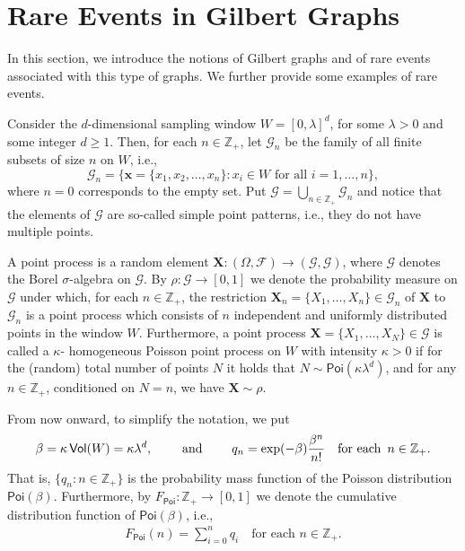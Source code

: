 \documentclass[pdflatex, sn-mathphys-ay]{sn-jnl}%
\newcommand{\intg}{\mathbb{Z}}
\newcommand{\mc}{\mathcal}
\renewcommand{\v}[1]{\boldsymbol{#1}}
\newcommand{\poi}{\textsf{Poi}}
\newcommand{\mx}{\v{x}}
\newcommand{\mX}{\v{X}}
\newcommand{\scG}{\mathscr{G}}
\newcommand{\vol}{\mathsf{Vol}}
\theoremstyle{thmstyleone}%
\theoremstyle{thmstyletwo}%
\theoremstyle{thmstylethree}%
\begin{document}
\section{Rare Events in Gilbert Graphs}
\label{sec:prelim}
In this section, we introduce the notions of   Gilbert graphs and of rare events associated with this type of graphs. We further provide some  examples of rare events. 

Consider the $d$-dimensional sampling window ${W = [0, \lambda]^d}$,  for some $\lambda>0$ and some integer  $d\ge 1$.  Then, for each ${n \in \intg_+}$, let $\scG_n$ be the family of all finite subsets of size $n$ on $W$, i.e.,
\[
\scG_n = \Big\{\mx = \{x_1, x_2, \dots, x_n\} : x_i \in W\,\, \text{for all}\,\, i=1,\ldots, n \Big\},
\]
where $n = 0$ corresponds to the empty set. Put ${\scG = \bigcup_{n \in \intg_+} \scG_n}$ and 
notice that the elements of $\scG$ are so-called  simple point patterns, i.e., they do not have multiple points.

A  point process is a random element ${\mX : (\Omega, \mc F) \to (\scG, \mc G)}$, where $\mc G$ denotes the Borel $\sigma$-algebra on $\scG$. 
By $\rho:\mc G\to[0,1]$ we denote the probability measure on $\scG$ under which, for each $n \in \intg_+$, 
the restriction $\mX_n = \{X_1, \dots, X_n\} \in \scG_n$ of $\mX$  to $\scG_n$  is a point process which consists of $n$ independent and uniformly distributed points in the window $W$.  
Furthermore, a point process $\mX = \{X_1, \dots, X_N\}\in \scG$ is called a $\kappa$- homogeneous Poisson point process  on $W$ 
with intensity ${\kappa > 0}$ if for the  (random) total number of points $N$ it holds that ${N \sim \mathsf{Poi}(\kappa \lambda^d)}$, and for any $n \in \intg_+$, conditioned on $N = n$, we have $\mX \sim \rho$.

From now onward, to simplify the notation, we put
\begin{align}
\beta = \kappa\, \vol(W) = \kappa \lambda^d,
\qquad\text{ and }\qquad
q_n = \exp(-\beta) \frac{\beta^n}{n!} \quad\mbox{for each \,$n \in \intg_+$}. 
\label{eqn:defn-beta}
\end{align}
That is, $\{q_n : n \in \intg_+\}$ is the probability mass function of the Poisson distribution $\poi(\beta)$. Furthermore, by $F_{\poi}:\intg_+\to [0,1]$ we denote the cumulative  distribution function of $\mathsf{Poi}(\beta)$, i.e.,
\begin{align}
F_{\poi} (n) = \sum_{i = 0}^n q_i  \quad\mbox{for each $n\in\intg_+$.}
\label{eqn:Fpoi}
\end{align}
\end{document}
